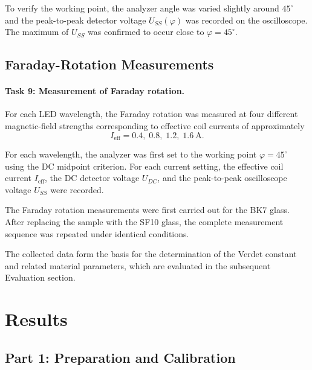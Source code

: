 \documentclass[a4paper]{article}
\begin{document}
To verify the working point, the analyzer angle was varied slightly around $45^\circ$ and the peak-to-peak detector voltage $U_{SS}(\varphi)$ was recorded on the oscilloscope.
The maximum of $U_{SS}$ was confirmed to occur close to $\varphi = 45^\circ$.

\subsection{Faraday-Rotation Measurements}

\paragraph{\textbf{Task 9: Measurement of Faraday rotation.}}
For each LED wavelength, the Faraday rotation was measured at four different magnetic-field strengths corresponding to effective coil currents of approximately
\[
  I_{\mathrm{eff}} = 0.4,\;0.8,\;1.2,\;1.6~\mathrm{A}.
\]

For each wavelength, the analyzer was first set to the working point $\varphi = 45^\circ$ using the DC midpoint criterion.
For each current setting, the effective coil current $I_{\mathrm{eff}}$, the DC detector voltage $U_{DC}$, and the peak-to-peak oscilloscope voltage $U_{SS}$ were recorded.

The Faraday rotation measurements were first carried out for the BK7 glass.
After replacing the sample with the SF10 glass, the complete measurement sequence was repeated under identical conditions.

The collected data form the basis for the determination of the Verdet constant and related material parameters, which are evaluated in the subsequent Evaluation section.

\titleformat{\paragraph}[hang]{\normalfont\normalsize\bfseries}{\theparagraph}{1em}{}

\section{Results}
\subsection{Part 1: Preparation and Calibration}
\end{document}
